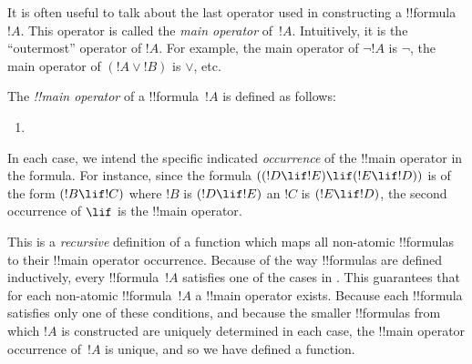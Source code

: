 \documentclass[../../include/open-logic-section]{subfiles}
\begin{document}


\begin{explain}
It is often useful to talk about the last operator used in
constructing a !!{formula}~$!A$.  This operator is called the \emph{main
  operator} of~$!A$. Intuitively, it is the ``outermost'' operator
of $!A$. For example, the main operator of $\lnot !A$ is $\lnot$,
the main operator of $(!A \lor !B)$ is $\lor$, etc.
\end{explain}


\begin{defn}
The \emph{!!{main operator}} of a !!{formula}~$!A$ is 
defined as follows:
\begin{enumerate}
\item {}







\end{enumerate}
\end{defn}

In each case, we intend the specific indicated \emph{occurrence} of
the !!{main operator} in the formula. For instance, since the formula
$((!D \lif !E) \lif (!E \lif !D))$ is of the form $(!B \lif !C)$ where
$!B$ is $(!D \lif !E)$ an $!C$ is $(!E \lif !D)$, the second
occurrence of $\lif$ is the !!{main operator}.

\begin{explain}
This is a \emph{recursive} definition of a function which maps all
non-atomic !!{formula}s to their !!{main operator} occurrence. Because
of the way !!{formula}s are defined inductively, every
!!{formula}~$!A$ satisfies one of the cases in .
This guarantees that for each non-atomic !!{formula}~$!A$ a !!{main
  operator} exists. Because each !!{formula} satisfies only one of these
conditions, and because the smaller !!{formula}s from which $!A$ is
constructed are uniquely determined in each case, the !!{main
  operator} occurrence of~$!A$ is unique, and so we have defined a
function.
\end{explain}
\end{document}
